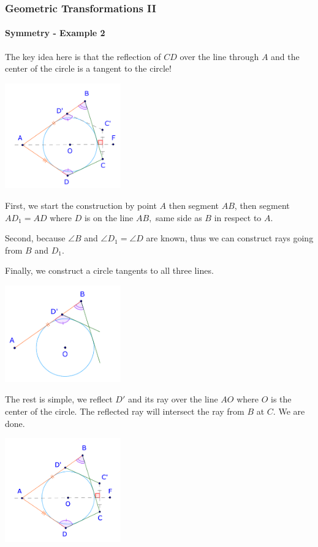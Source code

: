 \documentclass[8pt,xcolor=table,dvipsnames]{beamer}
\begin{document}
\begin{frame}[t]
    \frametitle{Geometric Transformations II}
    \framesubtitle{Symmetry - Example 2}
    \begin{overprint}
        The key idea here is that the reflection of $CD$ over the line through $A$ and the center of the circle is a tangent to the circle!
        \begin{center}
            \includegraphics[width=5cm]{./svg/pdf/symmetry-2d.pdf}
        \end{center}
        First, we start the construction by point $A$ then segment $AB$,
        then segment $AD_1 = AD$ where $D$ is on the line $AB,$ same side as $B$ in respect to $A$.

        \bigbreak
        Second, because $\angle B$ and $\angle D_1= \angle D$ are known, thus we can construct rays going from $B$ and $D_1.$
        
        \bigbreak
        Finally, we construct a circle tangents to all three lines.
        \begin{center}
            \includegraphics[width=5cm]{./svg/pdf/symmetry-2b.pdf}
        \end{center}
        The rest is simple, we reflect $D'$ and its ray over the line $AO$ where $O$ is the center of the circle.
        The reflected ray will intersect the ray from $B$ at $C.$ We are done.
        \begin{center}
            \includegraphics[width=5cm]{./svg/pdf/symmetry-2c.pdf}
        \end{center}
    \end{overprint}
\end{frame}
\end{document}
